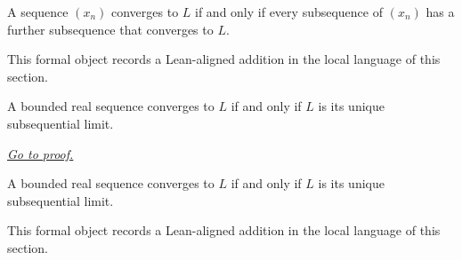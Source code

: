 \begin{remark*}
A sequence $(x_n)$ converges to $L$ if and only if every subsequence of $(x_n)$ has a further subsequence that converges to $L$.
\end{remark*}

\begin{remark*}[Interpretation]
This formal object records a Lean-aligned addition in the local language of this section.
\end{remark*}

\begin{dependencies}
\NoLocalDependencies
\end{dependencies}
\begin{theorem}
\label{thm:bounded-sequence-converges-iff-unique-subsequential-limit}
A bounded real sequence converges to $L$ if and only if $L$ is its unique subsequential limit.

\smallskip
\noindent
\hyperref[prf:bounded-sequence-converges-iff-unique-subsequential-limit]{\textit{Go to proof.}}
\end{theorem}

\begin{remark*}
A bounded real sequence converges to $L$ if and only if $L$ is its unique subsequential limit.
\end{remark*}

\begin{remark*}[Interpretation]
This formal object records a Lean-aligned addition in the local language of this section.
\end{remark*}

\begin{dependencies}
\NoLocalDependencies
\end{dependencies}
